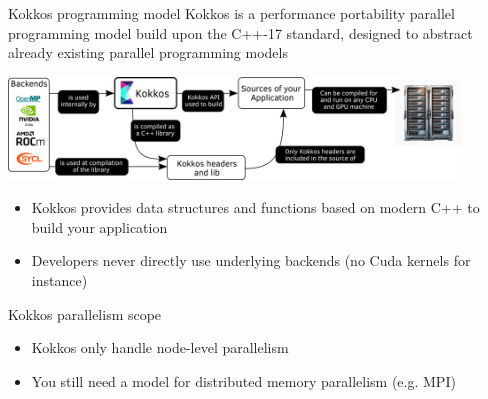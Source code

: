 \documentclass[
    aspectratio=169,
]{beamer}
\begin{document}
\begin{frame}{Kokkos programming model}
    Kokkos is a performance portability parallel programming model build upon the C++-17 standard, designed to abstract already existing parallel programming models

    \vspace{0.5em}

    \begin{center}
        \includegraphics[width=0.9\textwidth]{kokkos_model.png}
    \end{center}
    \begin{itemize}
        \item Kokkos provides data structures and functions based on modern C++ to build your application
        \item Developers never directly use underlying backends (no Cuda kernels for instance)
    \end{itemize}
\end{frame}


\begin{frame}{Kokkos parallelism scope}
    \begin{itemize}
        \item Kokkos only handle node-level parallelism
        \item You still need a model for distributed memory parallelism (e.g. MPI)
    \end{itemize}
\end{frame}

\end{document}
